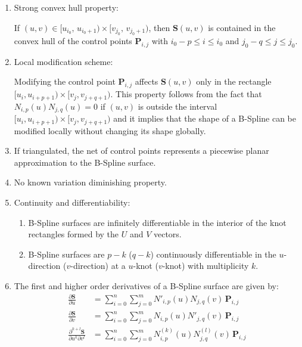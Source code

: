 \begin{enumerate}
    \item Strong convex hull property:
    
    If $(u,v) \in [u_{i_{0}},\, u_{i_{0}+1}) \times [v_{j_{0}},\, v_{j_{0}+1})$, then $\mathbf{S}(u, v)$ is contained in the convex hull of the control points $\boldsymbol{P}_{i,j}$ with $i_{0}-p \leq i \leq i_{0}$ and $j_{0}-q \leq j \leq j_{0}$.

    \item Local modification scheme:
    
    Modifying the control point $\mathbf{P}_{i,j}$ affects $\mathbf{S}(u, v)$ only in the rectangle $[u_{i}, u_{i+p+1}) \times [v_{j}, v_{j+q+1})$. This property follows from the fact that $N_{i,p}(u)N_{j,q}(u)=0$ if $(u,v)$ is outside the interval $[u_{i}, u_{i+p+1}) \times [v_{j}, v_{j+q+1})$ and it implies that the shape of a B-Spline can be modified locally without changing its shape globally.
    
    \item If triangulated, the net of control points represents a piecewise planar approximation to the B-Spline surface.

    \item No known variation diminishing property.
    
    \item Continuity and differentiability:
    \begin{enumerate}
        \item B-Spline surfaces are infinitely differentiable in the interior of the knot rectangles formed by the $U$ and $V$ vectors.
        \item B-Spline surfaces are $p-k$ ($q-k$) continuously differentiable in the $u$-direction ($v$-direction) at a $u$-knot ($v$-knot) with multiplicity $k$.
    \end{enumerate}
    
    \item The first and higher order derivatives of a B-Spline surface are given by:
        \begin{align*}
            \frac{\partial\mathbf{S}}{\partial u} &= \sum_{i=0}^{n} \sum_{j=0}^{m} N'_{i,p}(u) N_{j,q}(v)\, \mathbf{P}_{i,j} \\
            \frac{\partial\mathbf{S}}{\partial v} &= \sum_{i=0}^{n} \sum_{j=0}^{m} N_{i,p}(u) N'_{j,q}(v)\, \mathbf{P}_{i,j} \\
            \frac{\partial^{k+l}\mathbf{S}}{\partial u^{k} \partial v^{l}} &= \sum_{i=0}^{n} \sum_{j=0}^{m} N^{(k)}_{i,p}(u) N^{(l)}_{j,q}(v)\, \mathbf{P}_{i,j}
        \end{align*}
        

\end{enumerate}
